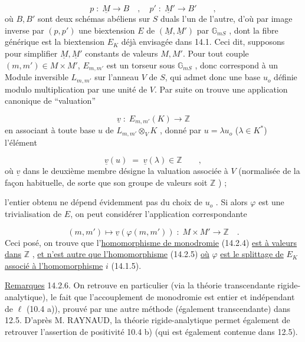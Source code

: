 \begin{equation*}
p \;:\; \underline{M} \longrightarrow B \quad , \quad p' \;:\; \underline{M}' \longrightarrow B' \qquad ,
\end{equation*}
où $B,B'$ sont deux schémas abéliens sur $S$ duals l'un de l'autre, d'où par image inverse par $(p,p')$ une biextension $E$ de $(\underline{M},\underline{M}')$ par $\mathbb{G}_{mS}$ , dont la fibre générique est la biextension $E_K$ déjà envisagée dans 14.1. Ceci dit, supposons pour simplifier $\underline{M},\underline{M}'$ constants de valeurs $M,M'$. Pour tout couple $(m,m') \in M \times M'$, $E_{m,m'}$ est un torseur sous $\mathbb{G}_{mS}$ , donc correspond à un Module inversible $L_{m,m'}$ sur l'anneau $V$ de $S$, qui admet donc une base $u_o$ définie modulo multiplication par une unité de $V$. Par suite on trouve une application canonique de ``valuation''

\begin{equation*}
\underline{v} \;:\; E_{m,m'}(K) \longrightarrow \mathbb{Z}
\end{equation*}
en associant à toute base $u$ de $L_{m,m'} \otimes_V K$ , donné par $u = \lambda u_o$ ($\lambda \in K^*$) l'élément

\begin{equation*}
\underline{v}(u) \;=\; \underline{v}(\lambda) \in \mathbb{Z} \qquad ,
\end{equation*}
où $\underline{v}$ dans le deuxième membre désigne la valuation associée à $V$ (normalisée de la façon habituelle, de sorte que son groupe de valeurs soit $\mathbb{Z}$ ) ;



l'entier obtenu ne dépend évidemment pas du choix de $u_o$ . Si alors $\varphi$ est une trivialisation de $E$, on peut considérer l'application correspondante

\begin{equation}\tag{14.2.5}
(m,m') \longmapsto \underline{v}(\varphi(m,m')) \; : \; M \times M' \longrightarrow \mathbb{Z} \quad .
\end{equation}
Ceci posé, on trouve que l'\underline{homomorphisme de monodromie} (14.2.4) \underline{est à valeurs dans} $\mathbb{Z}$ , \underline{et n'est autre que l'homomorphisme} (14.2.5) \underline{où} $\varphi$ \underline{est le splittage de} $E_K$ \underline{associé à l'homomorphisme} $i$ (14.1.5).

\underline{Remarques} 14.2.6. On retrouve en particulier (via la théorie transcendante rigide-analytique), le fait que l'accouplement de monodromie est entier et indépendant de $\ell$ (10.4 a)), prouvé par une autre méthode (également transcendante) dans 12.5. D'après M. RAYNAUD, la théorie rigide-analytique permet également de retrouver l'assertion de positivité 10.4 b) (qui est également contenue dans 12.5).

